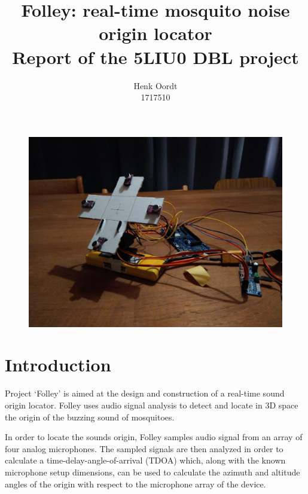 \documentclass[a4paper]{article}
\begin{document}
\title{{Folley: real-time mosquito noise origin locator} \\\large {Report of the 5LIU0 DBL project}}
\author{{Henk Oordt} \hfill
\\
{1717510} \hfill}
\maketitle
\begin{figure}[H]
    \begin{center}
        \includegraphics[width=\linewidth]{assets/device.jpeg}
    \end{center}
\end{figure}


\newpage

\section{Introduction}
Project `Folley' is aimed at the design and construction of a real-time sound origin locator. Folley uses audio signal analysis to detect and locate in 3D space the origin of the buzzing sound of mosquitoes.

In order to locate the sounds origin, Folley samples audio signal from an array of four analog microphones. The sampled signals are then analyzed in order to calculate a time-delay-angle-of-arrival (TDOA) \cite{6327613} which, along with the known microphone setup dimensions, can be used to calculate the azimuth and altitude angles of the origin with respect to the microphone array of the device.
\end{document}
